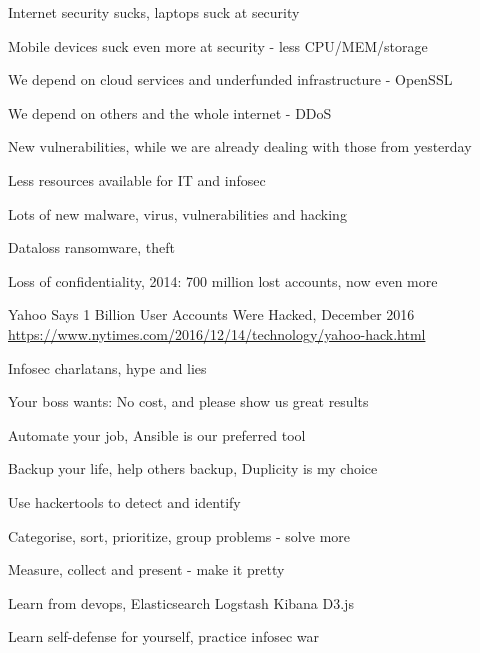 \documentclass[20pt,landscape,a4paper,footrule]{foils}
\begin{document}

\begin{list1}
\item Internet security sucks, laptops suck at security
\item Mobile devices suck even more at security - less CPU/MEM/storage
\item We depend on cloud services and underfunded infrastructure - OpenSSL
\item We depend on others and the whole internet - DDoS
\item New vulnerabilities, while we are already dealing with those from yesterday
\end{list1}



\begin{list1}
\item Less resources available for IT and infosec
\item Lots of new malware, virus, vulnerabilities and hacking
\item Dataloss ransomware, theft
\item Loss of confidentiality, 2014: 700 million lost accounts, now even more
\item Yahoo Says 1 Billion User Accounts Were Hacked, December 2016\\
\url{https://www.nytimes.com/2016/12/14/technology/yahoo-hack.html}
\item Infosec charlatans, hype and lies
\end{list1}

\vskip 2cm
\centerline{Your boss wants: No cost, and please show us great results}


\vskip 2cm



\begin{list1}
\item Automate your job, Ansible is our preferred tool
\item Backup your life, help others backup, Duplicity is my choice
\item Use hackertools to detect and identify
\item Categorise, sort, prioritize, group problems - solve more
\item Measure, collect and present - make it pretty
\item Learn from devops, Elasticsearch Logstash Kibana D3.js
\item {} Learn self-defense for yourself, practice infosec war
\end{list1}
\end{document}
